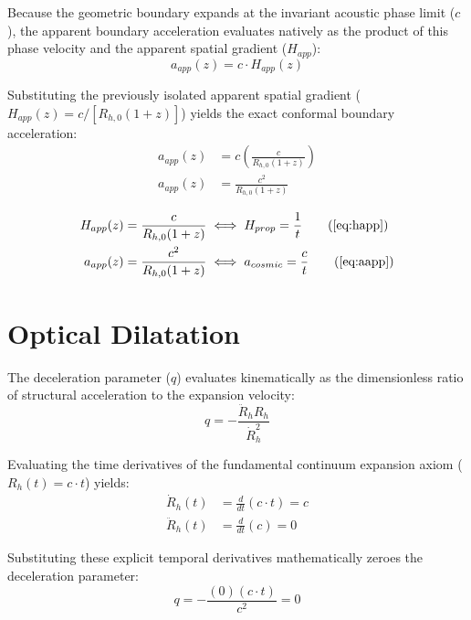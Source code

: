\documentclass[11pt, a4paper]{article}
\begin{document}
Because the geometric boundary expands   at the invariant acoustic phase limit ($c$), the apparent boundary acceleration evaluates natively as the product of this phase velocity and the apparent spatial gradient ($H_{app}$):
\begin{equation}
    a_{app}(z) = c \cdot H_{app}(z)
\end{equation}

Substituting the previously isolated apparent spatial gradient ($H_{app}(z) = c / [R_{h,0}(1+z)]$) yields the exact conformal boundary acceleration:
\begin{align}
    a_{app}(z) &= c \left( \frac{c}{R_{h,0}(1+z)} \right) \\
    a_{app}(z) &= \frac{c^2}{R_{h,0}(1+z)}
\end{align}

\begin{tcolorbox}[recallbox, title={\ref{box:kinematic_gradients}. Kinematic Gradients}]
\begin{align}
    H_{app}(z) &= \frac{c}{R_{h,0}(1+z)} \iff H_{prop} = \frac{1}{t} \tag{\ref{eq:happ}} \\
    a_{app}(z) &= \frac{c^2}{R_{h,0}(1+z)} \iff a_{cosmic} = \frac{c}{t} \tag{\ref{eq:aapp}}
\end{align}
\end{tcolorbox}


\section{Optical Dilatation}
\label{sec:deriv_optical_dilatation}

The deceleration parameter ($q$) evaluates kinematically as the dimensionless ratio of structural acceleration to the expansion velocity:
\begin{equation}
    q = -\frac{\ddot{R}_h R_h}{\dot{R}_h^2}
\end{equation}

Evaluating the time derivatives of the fundamental continuum expansion axiom ($R_h(t) = c \cdot t$) yields:
\begin{align}
    \dot{R}_h(t) &= \frac{d}{dt}(c \cdot t) = c \\
    \ddot{R}_h(t) &= \frac{d}{dt}(c) = 0
\end{align}

Substituting these explicit temporal derivatives mathematically zeroes the deceleration parameter:
\begin{equation}
    q = -\frac{(0)(c \cdot t)}{c^2} = 0
\end{equation}
\end{document}
